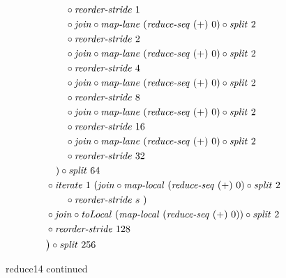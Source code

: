 \begin{figure*}[t]
\begin{align*}
\begin{aligned}
    &\qquad\qquad \circ \reorderStride\ 1\\
    &\qquad\qquad \circ \join \circ \mapLane\ (\reduceSeq\ (+)\ 0) \circ \splitN\ 2\\
    &\qquad\qquad \circ \reorderStride\ 2\\
    &\qquad\qquad \circ \join \circ \mapLane\ (\reduceSeq\ (+)\ 0) \circ \splitN\ 2\\
    &\qquad\qquad \circ \reorderStride\ 4\\
    &\qquad\qquad \circ \join \circ \mapLane\ (\reduceSeq\ (+)\ 0) \circ \splitN\ 2\\
    &\qquad\qquad \circ \reorderStride\ 8\\
    &\qquad\qquad \circ \join \circ \mapLane\ (\reduceSeq\ (+)\ 0) \circ \splitN\ 2\\
    &\qquad\qquad \circ \reorderStride\ 16\\
    &\qquad\qquad \circ \join \circ \mapLane\ (\reduceSeq\ (+)\ 0) \circ \splitN\ 2\\
    &\qquad\qquad \circ \reorderStride\ 32\\
    &\qquad\quad) \circ \splitN\ 64\\
    &\qquad \circ \iterateN\ 1\ (\join \circ \mapLocal\ (\reduceSeq\ (+)\ 0) \circ \splitN\ 2\\
    &\qquad\qquad \circ \reorderStride\ s\ )\\
    &\qquad \circ \join \circ \toLocal\ (\mapLocal\ (\reduceSeq\ (+)\ 0)) \circ \splitN\ 2\\
    &\qquad \circ \reorderStride\ 128\\
    &\qquad\big) \circ \splitN\ 256
  \end{aligned}
%  
\end{align*}
\caption{reduce14 continued}
\end{figure*}


